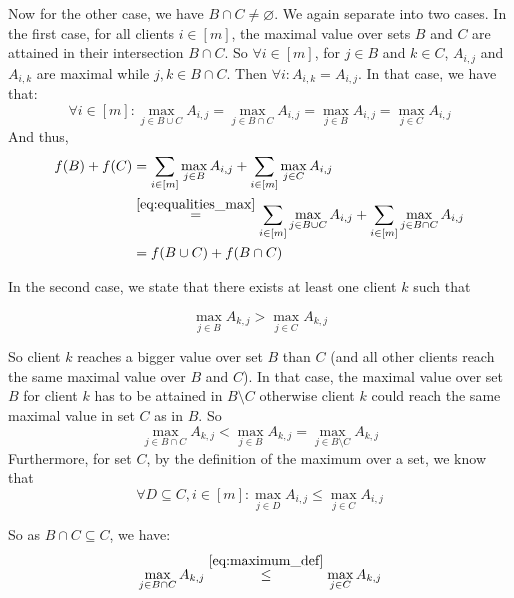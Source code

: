 \documentclass[10pt,usenames,dvipsnames]{article}
\newenvironment{exercise}[2][Exercise]{\begin{trivlist}
  \item[\hskip \labelsep {\bfseries #1}\hskip \labelsep {\bfseries #2.}]}{\end{trivlist}}
\begin{document}
\begin{exercise}{4}
Now for the other case, we have $B \cap C \neq \varnothing$. We again separate into two cases. In the first case,  for all clients $i \in [m]$, the maximal value over sets $B$ and $C$ are attained in their intersection $B\cap C$. So $ \forall i \in [m]$, for $j \in B$ and $k \in C$, $A_{i,j}$ and $A_{i,k}$ are maximal while $j,k \in B \cap C$. Then $\forall i: A_{i,k} = A_{i,j}$. In that case, we have that: 
\begin{equation}
    \label{eq:equalities_max}
    \forall i \in [m] :  \max\limits_{j\in B \cup C}A_{i,j} = \max\limits_{j\in B \cap C}A_{i,j} = \max\limits_{j\in B}A_{i,j}  = \max\limits_{j\in C}A_{i,j}
\end{equation}
And thus,
\begin{align*}
    f(B) + f(C) &= \sum_{i\in[m]} \max\limits_{j\in B}A_{i,j} + \sum_{i\in[m]} \max\limits_{j\in C}A_{i,j} \\
    &\overset{\eqref{eq:equalities_max}}{=}  \sum_{i\in[m]} \max\limits_{j\in B \cup C}A_{i,j} + \sum_{i\in[m]}  \max\limits_{j\in B \cap C}A_{i,j} \\
    &= f(B \cup C) + f(B \cap C) 
\end{align*}

In the second case, we state that there exists at least one client $k$ such that 

\begin{equation}
\label{eq: client_k}
    \max\limits_{j\in B}A_{k,j}  > \max\limits_{j\in C}A_{k,j}
\end{equation}

So client $k$ reaches a bigger value over set $B$ than $C$ (and all other clients reach the same maximal value over $B$ and $C$). In that case, the maximal value over set $B$ for client $k$ has to be attained in $B\setminus C$ otherwise client $k$ could reach the same maximal value in set $C$ as in $B$. So
\begin{equation}
    \max\limits_{j\in B \cap C}A_{k,j}  < \max\limits_{j\in B}A_{k,j}  = \max\limits_{j\in B\setminus C}A_{k,j} 
\end{equation}
Furthermore, for set $C$, by the definition of the maximum over a set, we know that 
\begin{equation}
    \label{eq:maximum_def}
    \forall D \subseteq C, i \in [m]: \max\limits_{j \in D} A_{i,j} \leq  \max\limits_{j \in C} A_{i,j}
\end{equation}

So as $B\cap C \subseteq C$, we have:
\begin{equation}
\label{eq:max_lower}
    \max\limits_{j\in B \cap C}A_{k,j} \overset{\eqref{eq:maximum_def}}{\leq} \max\limits_{j\in C}A_{k,j}
\end{equation}


\end{exercise}
\end{document}
